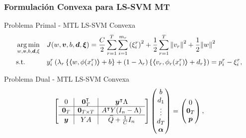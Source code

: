 \documentclass[aspectratio=43]{beamer}
\DeclareMathOperator*{\argmin}{arg\min}
\newcommand{\norm}[1]{\left\lVert#1\right\rVert}
\newcommand{\upper}[1]{\expandafter\MakeUppercase\expandafter{#1}}
\newcommand{\mymat}[1]{\upper{#1}}
\newcommand{\myvec}[1]{\bm{#1}}
\newcommand{\fv}[1]{\myvec{#1}}
\newcommand{\fm}[1]{\mymat{#1}}
\newcommand{\dotp}[2]{\bm{\left\langle} #1, #2 \bm{\right\rangle}}
\newcommand{\nsamples}{n}
\newcommand{\ntasks}{T}
\begin{document}
  \begin{frame}
      \frametitle{Formulación Convexa para LS-SVM MT}

      \begin{block}{Problema Primal - MTL LS-SVM Convexa}
            \begin{equation}\nonumber
                  \begin{aligned}
                  & \argmin_{w, \fv{v}, b, \fv{d}, \xi}
                  & & {J({w}, \fv{v}, b, \fv{d}, \fv{\xi}) = \frac{C}{2} \sum_{r= 1}^T \sum_{i=1}^{m_r} \left({\xi_{i}^r}\right)^2 + \frac{1}{2} \sum_{r= 1}^T{\norm{{v}_r}^2} + \frac{1}{2} {\norm{{w}}}^2} \\
                  & \text{s.t.}
                  & & y_{i}^r \left(\lambda_r \left\lbrace \dotp{w}{\phi(x_{i}^r)} + b  \right\rbrace + (1 - \lambda_r) \left\lbrace \dotp{{v}_r}{\phi_r(x_{i}^r)} + d_r \right\rbrace  \right) = p_{i}^r - \xi_{i}^r ,  \\
                  \end{aligned}
              \end{equation}
      \end{block}

      \begin{block}{Problema Dual - MTL LS-SVM Convexa}
            \begin{equation}
                  \nonumber
                  \begin{aligned}
                  \left[
                  \begin{array}{c|c|c}
                  0 & \fv{0}_\ntasks^\intercal &  \fv{y}^\intercal \Lambda \\
                  \hline
                  \fv{0}_\ntasks & \fv{0}_{\ntasks \times \ntasks} & \fm{A}^\intercal \fm{y} (I_\nsamples - \Lambda)\\
                  \hline
                  \fv{y} & \fm{y} \fm{A} & \widehat{\fm{Q}} + \frac{1}{C} \fm{I}_\nsamples
                  \end{array}
                  \right] 
                  \begin{pmatrix}
                      b \\
                      d_1 \\
                      \vdots \\
                      d_\ntasks \\
                      \fv{\alpha}
                  \end{pmatrix}
                  = 
                  \begin{pmatrix}
                      0 \\
                      \fv{0}_\ntasks \\
                      \fv{p}
                  \end{pmatrix}, 
                  \end{aligned}
              \end{equation}
      \end{block}

\end{frame}
\end{document}
